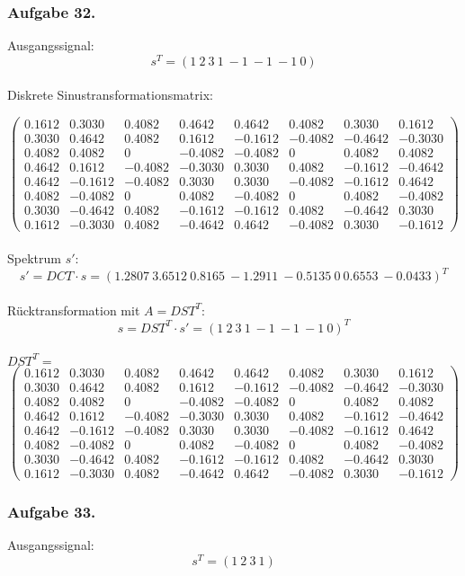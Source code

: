 \documentclass[a4paper,12pt]{article}
\newcommand{\ex}[1]{\newpage\subsubsection*{Aufgabe #1.}}
\begin{document}
	\ex{32}
	
	Ausgangssignal:
	\[ s^T = (1\ 2\ 3\ 1\ -1\ -1\ -1\ 0) \]\\
	
	Diskrete Sinustransformationsmatrix:
	
	\[\left(\begin{array}{rrrrrrrr}
	0.1612 & 0.3030 & 0.4082 & 0.4642 & 0.4642 & 0.4082 & 0.3030 & 0.1612 \\
	0.3030 & 0.4642 & 0.4082 & 0.1612 &-0.1612 &-0.4082 &-0.4642 &-0.3030 \\
	0.4082 & 0.4082 & 0 & -0.4082 & -0.4082 & 0 & 0.4082 & 0.4082 \\
	0.4642 & 0.1612 & -0.4082 & -0.3030 & 0.3030 & 0.4082 & -0.1612 & -0.4642 \\
	0.4642 & -0.1612 & -0.4082 & 0.3030 & 0.3030 & -0.4082 & -0.1612 & 0.4642 \\
	0.4082 & -0.4082 & 0 & 0.4082 & -0.4082 & 0 & 0.4082 & -0.4082 \\
	0.3030 & -0.4642 & 0.4082 & -0.1612 & -0.1612 & 0.4082 & -0.4642 & 0.3030 \\
	0.1612 & -0.3030 & 0.4082 & -0.4642 & 0.4642 & -0.4082 & 0.3030 & -0.1612
	\end{array}\right)\]\\
	
	Spektrum $s'$:
	\[s' = DCT \cdot s = (1.2807\ 3.6512\ 0.8165\ -1.2911\ -0.5135\ 0\ 0.6553\ -0.0433)^T\]\\
	
	
	
	Rücktransformation mit $A = DST^T$:
	\[ s = DST^T \cdot s' = (1\ 2\ 3\ 1\ -1\ -1\ -1\ 0)^T \]\\
	
	$DST^T=$
	\[\left(\begin{array}{rrrrrrrr}
	0.1612 & 0.3030 & 0.4082 & 0.4642 & 0.4642 & 0.4082 & 0.3030 & 0.1612 \\
	0.3030 & 0.4642 & 0.4082 & 0.1612 &-0.1612 &-0.4082 &-0.4642 &-0.3030 \\
	0.4082 & 0.4082 & 0 & -0.4082 & -0.4082 & 0 & 0.4082 & 0.4082 \\
	0.4642 & 0.1612 & -0.4082 & -0.3030 & 0.3030 & 0.4082 & -0.1612 & -0.4642 \\
	0.4642 & -0.1612 & -0.4082 & 0.3030 & 0.3030 & -0.4082 & -0.1612 & 0.4642 \\
	0.4082 & -0.4082 & 0 & 0.4082 & -0.4082 & 0 & 0.4082 & -0.4082 \\
	0.3030 & -0.4642 & 0.4082 & -0.1612 & -0.1612 & 0.4082 & -0.4642 & 0.3030 \\
	0.1612 & -0.3030 & 0.4082 & -0.4642 & 0.4642 & -0.4082 & 0.3030 & -0.1612
	\end{array}\right)\]
	
	\ex{33}
	
	Ausgangssignal:
	\[ s^T = (1\ 2\ 3\ 1) \]\\
	
	
	
	
	
	
	
\end{document}
